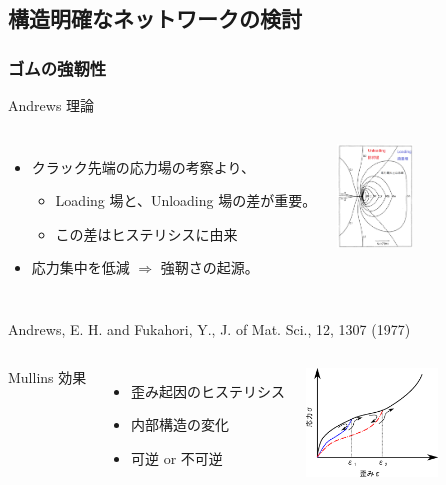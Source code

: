 \documentclass[unicode,12pt]{beamer}%
\begin{document}
\subsection{構造明確なネットワークの検討}

\begin{frame}
\frametitle{ゴムの強靭性}

\begin{exampleblock}{Andrews 理論}
\begin{columns}[totalwidth=1\textwidth]
    \begin{itemize}
    \item
    クラック先端の応力場の考察より、
        \begin{itemize}
        \item
        Loading 場と、Unloading 場の差が重要。
        \item
        この差はヒステリシスに由来
        \end{itemize}	
    \item
    応力集中を低減 $\Rightarrow$ 強靭さの起源。
    \end{itemize}
\centering
\includegraphics[width=20mm]{crack.png}
\end{columns}

\footnotesize
{Andrews, E. H. and Fukahori, Y., J. of Mat. Sci., 12, 1307 (1977)}
\end{exampleblock}

\begin{columns}[totalwidth=1\textwidth]
Mullins 効果
    \begin{itemize}
        \item 歪み起因のヒステリシス
        \item 内部構造の変化
        \item {\color{red} 可逆} or 不可逆
    \end{itemize}
    \centering
    \includegraphics[width=35mm]{Mullins_Efct.eps}
\end{columns}

\end{frame}
    
\end{document}
